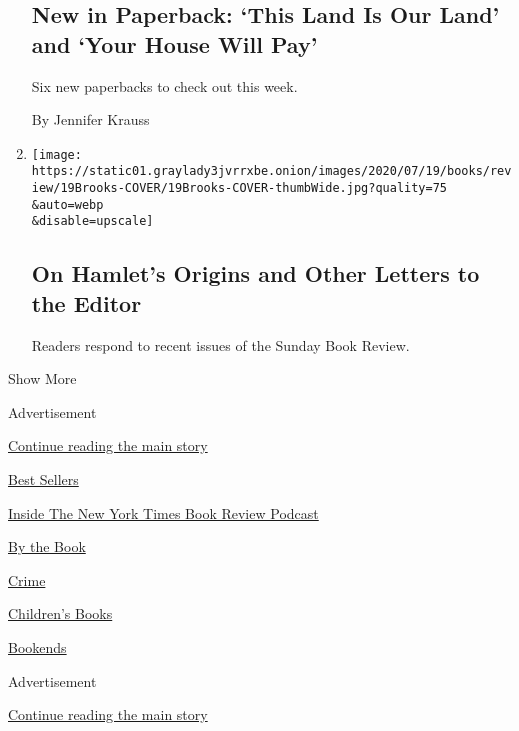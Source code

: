 \begin{enumerate}
  \hypertarget{new-in-paperback-this-land-is-our-land-and-your-house-will-pay}{%
  \subsection{New in Paperback: `This Land Is Our Land' and `Your House
  Will
  Pay'}\label{new-in-paperback-this-land-is-our-land-and-your-house-will-pay}}

  Six new paperbacks to check out this week.

  By Jennifer Krauss
\item
  \href{/2020/07/31/books/review/on-hamlets-origins-and-other-letters-to-the-editor.html}{}

  \texttt{[image: https://static01.graylady3jvrrxbe.onion/images/2020/07/19/books/review/19Brooks-COVER/19Brooks-COVER-thumbWide.jpg?quality=75\\\&auto=webp\\\&disable=upscale]}

  \hypertarget{on-hamlets-origins-and-other-letters-to-the-editor}{%
  \subsection{On Hamlet's Origins and Other Letters to the
  Editor}\label{on-hamlets-origins-and-other-letters-to-the-editor}}

  Readers respond to recent issues of the Sunday Book Review.
\end{enumerate}

Show More

Advertisement

\protect\hyperlink{after-mid2}{Continue reading the main story}

\href{https://www.nytimes3xbfgragh.onion/best-sellers-books/overview.html}{Best
Sellers}

\href{https://www.nytimes3xbfgragh.onion/column/book-review-podcast}{Inside
The New York Times Book Review Podcast}

\href{https://www.nytimes3xbfgragh.onion/column/by-the-book}{By the
Book}

\href{https://www.nytimes3xbfgragh.onion/column/crime}{Crime}

\href{https://www.nytimes3xbfgragh.onion/column/childrens-books}{Children's
Books}

\href{https://www.nytimes3xbfgragh.onion/column/bookends}{Bookends}

Advertisement

\protect\hyperlink{after-mktg}{Continue reading the main story}

